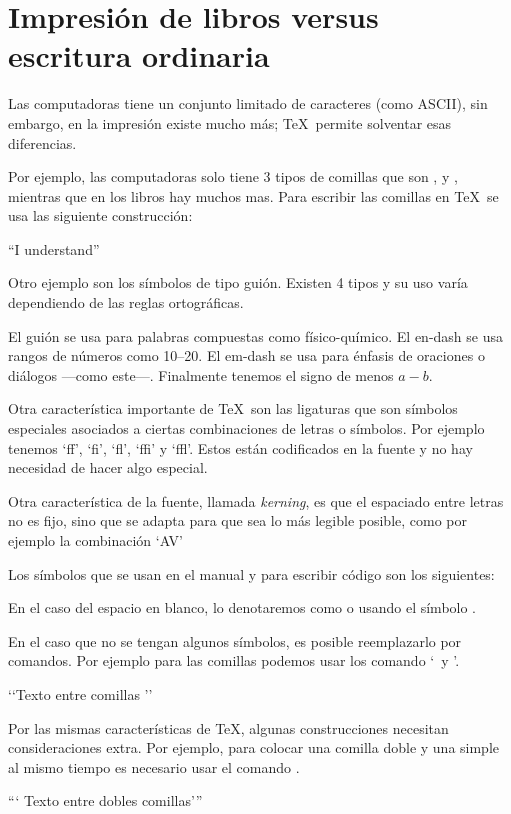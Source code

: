\section{Impresión de libros versus escritura ordinaria}

Las computadoras tiene un conjunto limitado de caracteres (como
ASCII), sin embargo, en la impresión existe mucho más; \TeX\
permite solventar esas diferencias.

Por ejemplo, las computadoras solo tiene 3 tipos de comillas que
son \codeline{`}, \codeline{'} y \codeline{"}, mientras que en
los libros hay muchos mas. Para escribir las comillas en \TeX\ se
usa las siguiente construcción:
\begin{texexample}
  ``I understand''
\end{texexample}
Otro ejemplo son los símbolos de tipo guión. Existen 4 tipos y su uso varía dependiendo de las reglas ortográficas.
\begin{texexample}
  El guión se usa para palabras compuestas como físico-químico.
  El en-dash se usa rangos de números como 10--20.
  El em-dash se usa para énfasis de oraciones o diálogos ---como este---.
  Finalmente tenemos el signo de menos $a - b$.
\end{texexample}

Otra característica importante de \TeX\ son las ligaturas que son símbolos especiales asociados a ciertas combinaciones de letras o símbolos. Por ejemplo tenemos `ff', `fi', `fl', `ffi' y `ffl'. Estos están codificados en la fuente y no hay necesidad de hacer algo especial.

Otra característica de la fuente, llamada \emph{kerning}, es que el espaciado entre letras no es fijo, sino que se adapta para que sea lo más legible posible, como por ejemplo la combinación `AV'

Los símbolos que se usan en el manual y para escribir código son
los siguientes:
En el caso del espacio en blanco, lo denotaremos como  o usando el símbolo \textvisiblespace.

En el caso que no se tengan algunos símbolos, es posible reemplazarlo por comandos. Por ejemplo para las comillas podemos usar los comando \texcs\lq\ y \texcs\rq.
\begin{texexample}
  \lq\lq Texto entre comillas \rq\rq
\end{texexample}

Por las mismas características de \TeX, algunas construcciones necesitan consideraciones extra. Por ejemplo, para colocar una comilla doble y una simple al mismo tiempo es necesario usar el comando \texcs\thinspace.
\begin{texexample}
  ``\thinspace` Texto entre dobles comillas'\thinspace''
\end{texexample}
